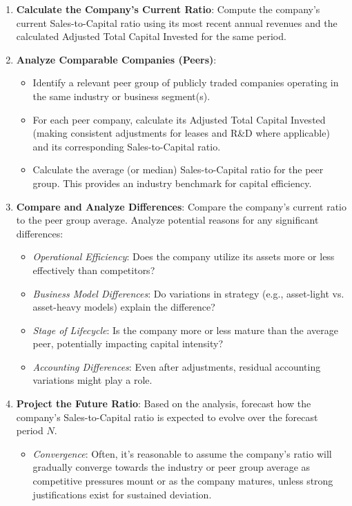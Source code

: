 \begin{enumerate}
    \item \textbf{Calculate the Company's Current Ratio}: Compute the company's current Sales-to-Capital ratio using its most recent annual revenues and the calculated Adjusted Total Capital Invested for the same period.
    \item \textbf{Analyze Comparable Companies (Peers)}:
          \begin{itemize}
              \item Identify a relevant peer group of publicly traded companies operating in the same industry or business segment(s).
              \item For each peer company, calculate its Adjusted Total Capital Invested (making consistent adjustments for leases and R\&D where applicable) and its corresponding Sales-to-Capital ratio.
              \item Calculate the average (or median) Sales-to-Capital ratio for the peer group. This provides an industry benchmark for capital efficiency.
          \end{itemize}
    \item \textbf{Compare and Analyze Differences}: Compare the company's current ratio to the peer group average. Analyze potential reasons for any significant differences:
          \begin{itemize}
              \item \textit{Operational Efficiency}: Does the company utilize its assets more or less effectively than competitors?
              \item \textit{Business Model Differences}: Do variations in strategy (e.g., asset-light vs. asset-heavy models) explain the difference?
              \item \textit{Stage of Lifecycle}: Is the company more or less mature than the average peer, potentially impacting capital intensity?
              \item \textit{Accounting Differences}: Even after adjustments, residual accounting variations might play a role.
          \end{itemize}
    \item \textbf{Project the Future Ratio}: Based on the analysis, forecast how the company's Sales-to-Capital ratio is expected to evolve over the forecast period \(N\).
          \begin{itemize}
              \item \textit{Convergence}: Often, it's reasonable to assume the company's ratio will gradually converge towards the industry or peer group average as competitive pressures mount or as the company matures, unless strong justifications exist for sustained deviation.

\end{itemize}
\end{enumerate}
